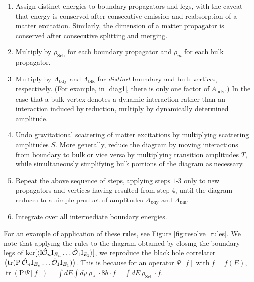 \documentclass[12pt]{article}
\newcommand{\blangle}{\bigl\langle}
\newcommand{\brangle}{\bigr\rangle}
\newcommand*{\corr}[1]{\langle{#1}\rangle}
\newcommand*{\bcorr}[1]{\blangle{#1}\brangle}
\newcommand{\calO}{\mathcal{O}}
\DeclareMathOperator{\tr}{tr}
\DeclareMathOperator{\Sch}{Sch}
\newcommand{\bdy}{\text{bdy}}
\newcommand{\blk}{\text{blk}}
\newcommand{\Rho}{\mathrm{P}}
\begin{document}
\begin{enumerate}

\item
Assign distinct energies to boundary propagators and legs, with the caveat that energy is conserved after consecutive emission and reabsorption of a matter excitation. Similarly, the dimension of a matter propagator is conserved after consecutive splitting and merging.

\item
Multiply by $\rho_{\Sch}$ for each boundary propagator and $\rho_{m}$ for each bulk propagator.

\item
Multiply by $A_{\bdy}$ and $A_{\blk}$ for \textit{distinct} boundary and bulk vertices, respectively. (For example, in \eqref{diag1}, there is only one factor of $A_{\bdy}$.) In the case that a bulk vertex denotes a dynamic interaction rather than an interaction induced by reduction, multiply by dynamically determined amplitude.

\item
Undo gravitational scattering of matter excitations by multiplying scattering amplitudes $S$. More generally, reduce the diagram by moving interactions from boundary to bulk or vice versa by multiplying transition amplitudes $T$, while simultaneously simplifying bulk portions of the diagram as necessary.

\item
Repeat the above sequence of steps, applying steps $1$-$3$ only to new propagators and vertices having resulted from step $4$, until the diagram reduces to a simple product of amplitudes $A_{\bdy}$ and $A_{\blk}$.

\item
Integrate over all intermediate boundary energies.

\end{enumerate}



For an example of application of these rules, see Figure \ref{fig:resolve_rules}. We note that applying the rules to the diagram obtained by closing the boundary legs of $\ker[\corr{{\rm I}\hat{\calO}_{n}{\rm I}_{E_n}\dots\hat{\calO}_{1}{\rm I}_{E_1}}] $, we reproduce the black hole correlator $\bcorr{\tr({\rm P} \,\hat{\calO}_{n}{\rm I}_{E_n}\dots \hat{\calO}_{1}{\rm I}_{E_1})}$. This is because for an operator $\Psi[f]$ with $f=f(E)$, $\tr(\Rho\, \Psi[f])=\int dE \int d\mu\,  \rho_{\text{Pl}}\cdot 8 b\cdot f = \int dE \, \rho_{\Sch}\cdot f$. 
\end{document}
